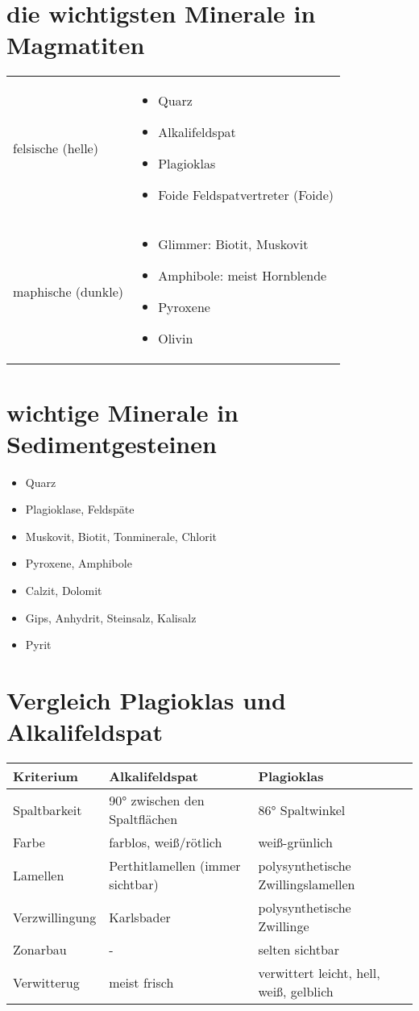 \documentclass[a4, 12pt]{scrreprt}
\begin{document}
\newpage
\chapter{die wichtigsten Minerale in Magmatiten}

\begin{tabular}{p{3cm}@{}|p{12cm}@{}}
felsische (helle) & 
\begin{itemize}
\item Quarz
\item Alkalifeldspat
\item Plagioklas
\item Foide
Feldspatvertreter (Foide)
\end{itemize}\\
maphische (dunkle) & 
\begin{itemize}
\item Glimmer: Biotit, Muskovit
\item Amphibole: meist Hornblende
\item Pyroxene
\item Olivin
\end{itemize}
\end{tabular}

\chapter{wichtige Minerale in Sedimentgesteinen}
\begin{itemize}
\item Quarz
\item Plagioklase, Feldspäte
\item Muskovit, Biotit, Tonminerale, Chlorit
\item Pyroxene, Amphibole
\item Calzit, Dolomit
\item Gips, Anhydrit, Steinsalz, Kalisalz
\item Pyrit
\end{itemize}

\chapter{Vergleich Plagioklas und Alkalifeldspat}

\begin{tabular}{l|p{7cm}@{}p{7cm}@{}}
Kriterium & Alkalifeldspat & Plagioklas\\
\hline
Spaltbarkeit & 90° zwischen den Spaltflächen & 86° Spaltwinkel\\
Farbe & farblos, weiß/rötlich & weiß-grünlich\\
Lamellen & Perthitlamellen (immer sichtbar) & polysynthetische Zwillingslamellen\\
Verzwillingung & Karlsbader & polysynthetische Zwillinge\\
Zonarbau & - & selten sichtbar\\
Verwitterug & meist frisch & verwittert leicht, hell, weiß, gelblich\\
\end{tabular}
\end{document}
